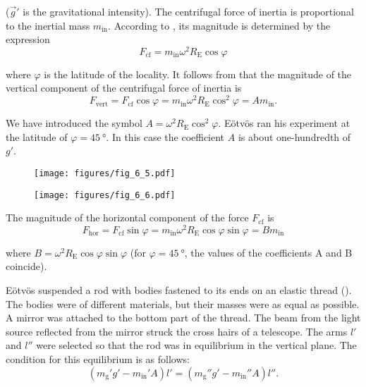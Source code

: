 \noindent
($\vec{g}'$ is the gravitational intensity). The centrifugal force of inertia is proportional to the inertial mass $m_{\text{in}}$. According to , its magnitude is determined by the expression
\begin{equation*}
	F_{\text{cf}} = m_{\text{in}}\omega^2R_{\text{E}}\cos\varphi
\end{equation*}

\noindent
where $\varphi$ is the latitude of the locality. It follows from  that the magnitude of the vertical component of the centrifugal force of inertia is
\begin{equation*}
	F_{\text{vert}} = F_{\text{cf}}\cos\varphi =  m_{\text{in}}\omega^2R_{\text{E}}\cos^2\varphi = Am_{\text{in}}.
\end{equation*}

\noindent
We have introduced the symbol $A=\omega^2R_{\text{E}}\cos^2\varphi$. E\"{o}tv\"{o}s ran his experiment at the latitude of $\varphi=\SI{45}{\degree}$. In this case the coefficient $A$ is about one-hundredth of $g'$.

\begin{figure}[t]
	\begin{minipage}[t]{0.5\linewidth}
		\begin{center}
			\texttt{[image: figures/fig\_6\_5.pdf]}
			\caption[]{}
			\label{fig:6_5}
		\end{center}
	\end{minipage}
	\hspace{-0.05cm}
	\begin{minipage}[t]{0.5\linewidth}
		\begin{center}
			\texttt{[image: figures/fig\_6\_6.pdf]}
			\caption[]{}
			\label{fig:6_6}
		\end{center}
	\end{minipage}
	\vspace{-0.5cm}
\end{figure}

The magnitude of the horizontal component of the force $F_{\text{cf}}$ is
\begin{equation*}
	F_{\text{hor}} = F_{\text{cf}}\sin\varphi =  m_{\text{in}}\omega^2R_{\text{E}}\cos\varphi\sin\varphi = Bm_{\text{in}}
\end{equation*}

\noindent
where $B=\omega^2R_{\text{E}}\cos\varphi\sin\varphi$ (for $\varphi=\SI{45}{\degree}$, the values of the coefficients A and B coincide).

E\"{o}tv\"{o}s suspended a rod with bodies fastened to its ends on an elastic thread (). The bodies were of different materials, but their masses were as equal as possible. A mirror was attached to the bottom part of the thread. The beam from the light source reflected from the mirror struck the cross hairs of a telescope. The arms $l'$ and $l''$ were selected so that the rod was in equilibrium in the vertical plane. The condition for this equilibrium is as follows:
\begin{equation}\label{eq:6_21}
	(m_{\text{g}}'g' - m_{\text{in}}'A)l' = (m_{\text{g}}''g' - m_{\text{in}}''A)l''.
\end{equation}

